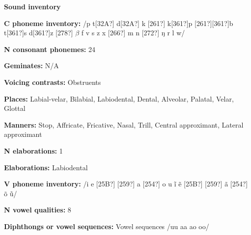 \begin{styleBody}
\textbf{Sound inventory}
\end{styleBody}

\begin{styleBody}
\textbf{C phoneme inventory:} /p t[32A?] d[32A?] k [261?] k[361?]p [261?][361?]b t[361?]s d[361?]z [278?] $\beta $ f v s z x [266?] m n [272?] ŋ r l w/
\end{styleBody}

\begin{styleBody}
\textbf{N consonant phonemes:} 24
\end{styleBody}

\begin{styleBody}
\textbf{Geminates:} N/A
\end{styleBody}

\begin{styleBody}
\textbf{Voicing contrasts:} Obstruents
\end{styleBody}

\begin{styleBody}
\textbf{Places:} Labial-velar, Bilabial, Labiodental, Dental, Alveolar, Palatal, Velar, Glottal
\end{styleBody}

\begin{styleBody}
\textbf{Manners:} Stop, Affricate, Fricative, Nasal, Trill, Central approximant, Lateral approximant
\end{styleBody}

\begin{styleBody}
\textbf{N elaborations:} 1
\end{styleBody}

\begin{styleBody}
\textbf{Elaborations:} Labiodental
\end{styleBody}

\begin{styleBody}
\textbf{V phoneme inventory:} /i e [25B?] [259?] a [254?] o u \~{i} \~{e} [25B?] [259?] \~{a} [254?] \~{o} \~{u}/
\end{styleBody}

\begin{styleBody}
\textbf{N vowel qualities:} 8
\end{styleBody}

\begin{styleBody}
\textbf{Diphthongs or vowel sequences:} Vowel sequences /uu aa ao oo/
\end{styleBody}

